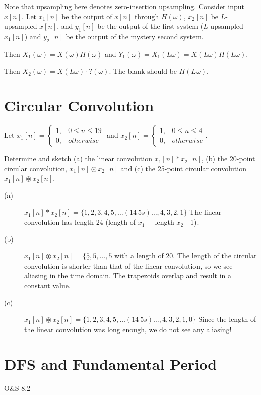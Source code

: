 \documentclass[11pt]{article}
\begin{document}
{\color{blue}
Note that upsampling here denotes zero-insertion upsampling. Consider input $x[n]$. Let $x_1[n]$ be the output of $x[n]$ through $H(\omega)$, $x_2[n]$ be $L$-upsampled $x[n]$, and $y_1[n]$ be the output of the first system ($L$-upsampled $x_1[n]$) and $y_2[n]$ be the output of the mystery second system.

Then $X_1(\omega)=X(\omega)H(\omega)$ and $Y_1(\omega) = X_1(L\omega) = X(L\omega)H(L\omega)$.

Then $X_2(\omega) = X(L\omega)\cdot ?(\omega)$. The blank should be $H(L\omega)$. 
}

\section{Circular Convolution}

Let $x_1[n] = \begin{cases} 1, & 0 \leq n \leq 19 \\
0, & otherwise
\end{cases}$ and $x_2[n] = \begin{cases} 1, & 0 \leq n \leq 4 \\
0, & otherwise
\end{cases}$. 

Determine and sketch (a) the linear convolution $x_1[n]*x_2[n]$, (b) the 20-point circular convolution, $x_1[n]\circledast x_2[n]$ and (c) the 25-point circular convolution $x_1[n]\circledast x_2[n]$.

{\color{blue}

\begin{description}
\item[(a)] $x_1[n]*x_2[n] = \{\underline{1},2, 3, 4, 5, \ldots  (14\ 5s) \ldots, 4,3,2, 1 \} $ The linear convolution has length 24 (length of $x_1$ + length $x_2$ - 1).
\item[(b)] $x_1[n]\circledast x_2[n] = \{\underline{5}, 5, \ldots, 5$  with a length of 20. The length of the circular convolution is shorter than that of the linear convolution, so we see aliasing in the time domain. The trapezoids overlap and result in a constant value.
\item[(c)] $x_1[n]\circledast x_2[n] = \{\underline{1},2, 3, 4, 5, \ldots  (14\ 5s) \ldots, 4,3,2, 1, 0 \}$ Since the length of the linear convolution was long enough, we do not see any aliasing!
\end{description}
}

\newpage 
\section{DFS and Fundamental Period}
O\&S 8.2
\end{document}
